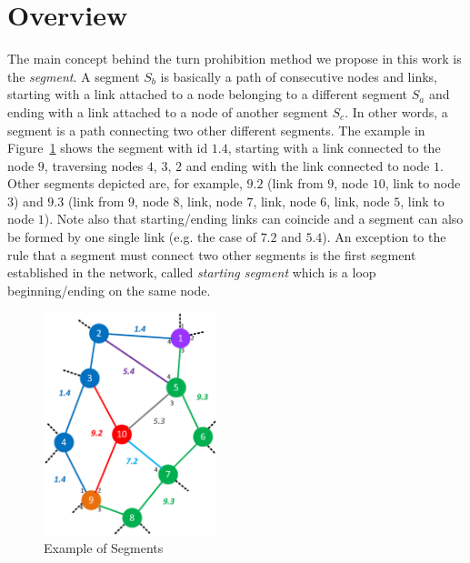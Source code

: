 
\section{\disr{} Overview}

\label{sec:disr_concepts}
The main concept behind the turn prohibition method we propose in this work
is the \emph{segment}. A segment $S_b$ is basically a path of consecutive
nodes and links, starting with a link attached to a node belonging to
a different segment $S_a$ and ending with a link attached to a
node of another segment $S_c$. In other words, a segment is
a path connecting two other different segments. The example
in Figure~\ref{fig:segments} shows the segment with id $1.4$, starting
with a link connected to the node $9$, traversing nodes
$4$, $3$, $2$ and ending with the link connected to node $1$. Other
segments depicted are, for example, $9.2$ (link from $9$, node $10$, link to node $3$) and $9.3$
(link from $9$, node $8$, link, node $7$, link, node $6$, link, node $5$, link to node $1$). Note
also that starting/ending links can coincide and a segment can also be
formed by one single link (e.g. the case of $7.2$ and $5.4$).
An exception to the rule that a segment must connect two other
segments is the first segment established in the network, called
\emph{starting segment} which is a loop beginning/ending on the same
node.

\begin{figure}
\centering
    \includegraphics[width=0.45\textwidth]{pictures/network_slice.eps}
  \caption{Example of Segments}
  \label{fig:segments}
\end{figure}

